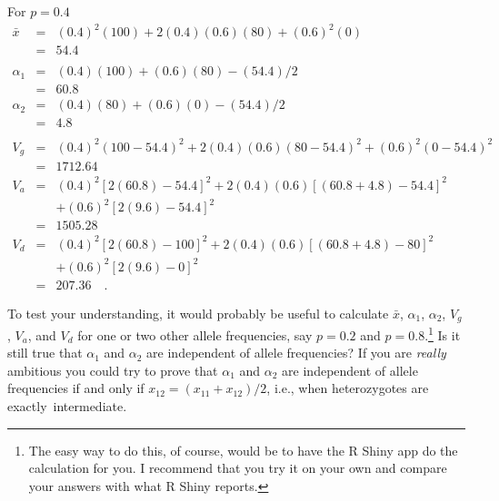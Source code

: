 \documentclass[12pt]{article}
\begin{document}
For $p = 0.4$
\begin{eqnarray*}
{\bar x} &=& (0.4)^2(100) + 2(0.4)(0.6)(80) + (0.6)^2(0) \\
                    &=& 54.4 \\
\\
\alpha_1 &=& (0.4)(100) + (0.6)(80) - (54.4)/2 \\
         &=& 60.8 \\
\alpha_2 &=& (0.4)(80) + (0.6)(0) - (54.4)/2 \\
         &=& 4.8 \\
\\
V_g &=& (0.4)^2(100-54.4)^2 + 2(0.4)(0.6)(80-54.4)^2 + (0.6)^2(0-54.4)^2 \\
    &=& 1712.64 \\
V_a &=& (0.4)^2[2(60.8)-54.4]^2 + 2(0.4)(0.6)[(60.8+4.8)-54.4]^2 \\
       &&+ (0.6)^2[2(9.6)-54.4]^2 \\
    &=& 1505.28 \\
V_d &=& (0.4)^2[2(60.8)-100]^2 + 2(0.4)(0.6)[(60.8+4.8) - 80]^2 \\
       &&+ (0.6)^2[2(9.6)-0]^2 \\
    &=& 207.36 \quad .
\end{eqnarray*}

To test your understanding, it would probably be useful to calculate
${\bar x}$, $\alpha_1$, $\alpha_2$, $V_g$, $V_a$, and $V_d$ for one or
two other allele frequencies, say $p=0.2$ and $p=0.8$.\footnote{The
  easy way to do this, of course, would be to have the R Shiny app do
  the calculation for you. I recommend that you try it on your own and
  compare your answers with what R Shiny reports.} Is it still true
that $\alpha_1$ and $\alpha_2$ are independent of allele frequencies?
If you are {\it really\/} ambitious you could try to prove that
$\alpha_1$ and $\alpha_2$ are independent of allele frequencies if and
only if $x_{12} = (x_{11}+x_{12})/2$, i.e., when heterozygotes are
exactly~intermediate.




\ccLicense
\end{document}
